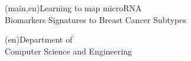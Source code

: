 
%




\nttitle(main,en){Learning to map microRNA\\Biomarkers Signatures to Breast Cancer Subtypes}%





\ntdepartment*(en){Department of\\Computer Science and Engineering}



